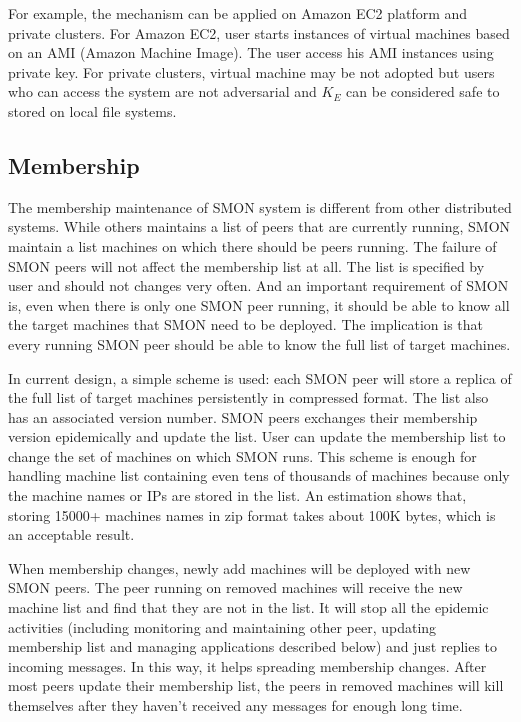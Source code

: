 For example, the mechanism can be applied on Amazon EC2
platform and private clusters. For Amazon EC2, user starts
instances of virtual machines based on an AMI (Amazon
Machine Image). The user access his AMI instances using
private key. For private clusters, virtual machine may be not
adopted but users who can access the system are not
adversarial and $K_E$ can be considered safe to stored on
local file systems.

\subsection{Membership}

The membership maintenance of SMON system is different from
other distributed systems. While others
maintains a list of peers that are currently running, SMON
maintain a list machines on which there should be peers
running. The failure of SMON peers will not affect the
membership list at all. The list is specified by user and
should not changes very often. And an important requirement
of SMON is, even when there is only one SMON peer running,
it should be able to know all the target machines that SMON
need to be deployed.  The implication is that every running
SMON peer should be able to know the full list of target
machines.

In current design, a simple scheme is used: each SMON peer
will store a replica of the full list of target machines
persistently in compressed format. The list also has an
associated version number. SMON peers exchanges their
membership version epidemically and update the list. User
can update the membership list to change the set of machines
on which SMON runs.
This scheme is enough for handling machine list containing
even tens of thousands of machines because only the machine
names or IPs are stored in the list.  An estimation shows
that, storing 15000+ machines names in zip format takes
about 100K bytes, which is an acceptable result.

When membership changes, newly add machines will be deployed
with new SMON peers. The peer running on removed machines
will receive the new machine list and find that they are not
in the list. It will stop all the epidemic activities
(including monitoring and maintaining other peer, updating
membership list and managing applications described below)
and just replies to incoming messages. In this way, it helps
spreading membership changes. After most peers update their
membership list, the peers in removed machines will kill
themselves after they haven't received any messages for
enough long time.

